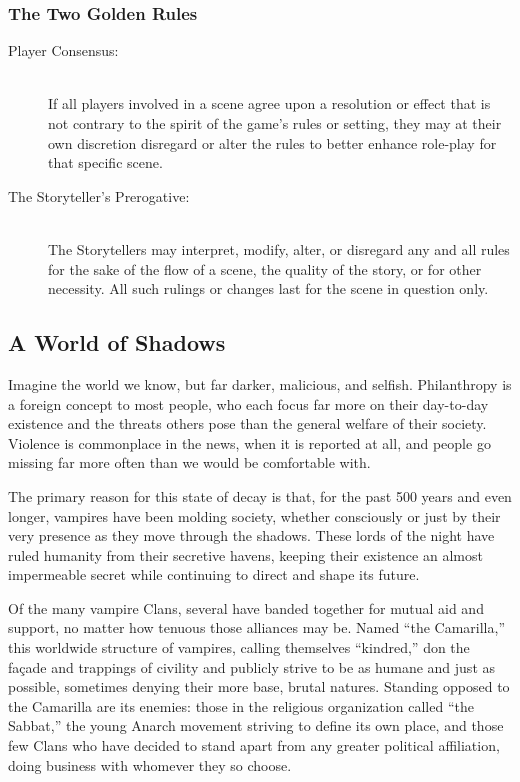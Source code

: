 \subsubsection{The Two Golden Rules}
\begin{description}
	\item[Player Consensus:] \hfill \\ 
	If all players involved in a scene agree upon a resolution or effect that 
	is not contrary to the spirit of the game's rules or setting, they may at their 
	own discretion disregard or alter the rules to better enhance role-play for 
	that specific scene. \\
	\item[The Storyteller's Prerogative:] \hfill \\
	The Storytellers may interpret, modify, alter, or disregard any and all rules 
	for the sake of the flow of a scene, the quality of the story, or for other 
	necessity.  All such rulings or changes last for the scene in question only.
\end{description}

\subsection{A World of Shadows}
Imagine the world we know, but far darker, malicious, and selfish.  Philanthropy is a 
foreign concept to most people, who each focus far more on their day-to-day existence and the 
threats others pose than the general welfare of their society.  Violence is commonplace in 
the news, when it is reported at all, and people go missing far more often than we would be 
comfortable with.

The primary reason for this state of decay is that, for the past 500 years and even longer, 
vampires have been molding society, whether consciously or just by their very presence as they 
move through the shadows.  These lords of the night have ruled humanity from their secretive 
havens, keeping their existence an almost impermeable secret while continuing to direct and shape 
its future.

Of the many vampire Clans, several have banded together for mutual aid and support, no matter how 
tenuous those alliances may be.  Named ``the Camarilla,'' this worldwide structure of vampires, 
calling themselves ``kindred,'' don the fa\c{c}ade and trappings of civility and publicly strive 
to be as humane and just as possible, sometimes denying their more base, brutal natures.  Standing 
opposed to the Camarilla are its enemies:  those in the religious organization called ``the Sabbat,'' 
the young Anarch movement striving to define its own place, and those few Clans who have decided to 
stand apart from any greater political affiliation, doing business with whomever they so choose.

